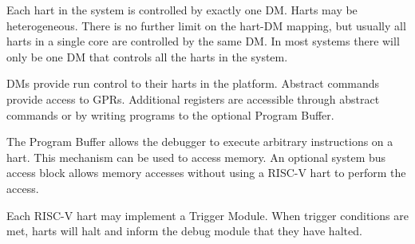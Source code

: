 Each hart in the system is controlled by exactly one DM. Harts may be
heterogeneous. There is no further limit on the hart-DM mapping, but usually
all harts in a single core are controlled by the same DM. In most systems there
will only be one DM that controls all the harts in the system.

DMs provide run control to their harts in the platform. Abstract commands
provide access to GPRs. Additional registers are accessible through abstract
commands or by writing programs to the optional Program Buffer.

The Program Buffer allows the debugger to execute arbitrary instructions on a
hart. This mechanism can be used to access memory.  An optional system bus
access block allows memory accesses without using a RISC-V hart to perform the
access.

Each RISC-V hart may implement a Trigger Module. When trigger conditions
are met, harts will halt and inform the debug module that they have
halted.
